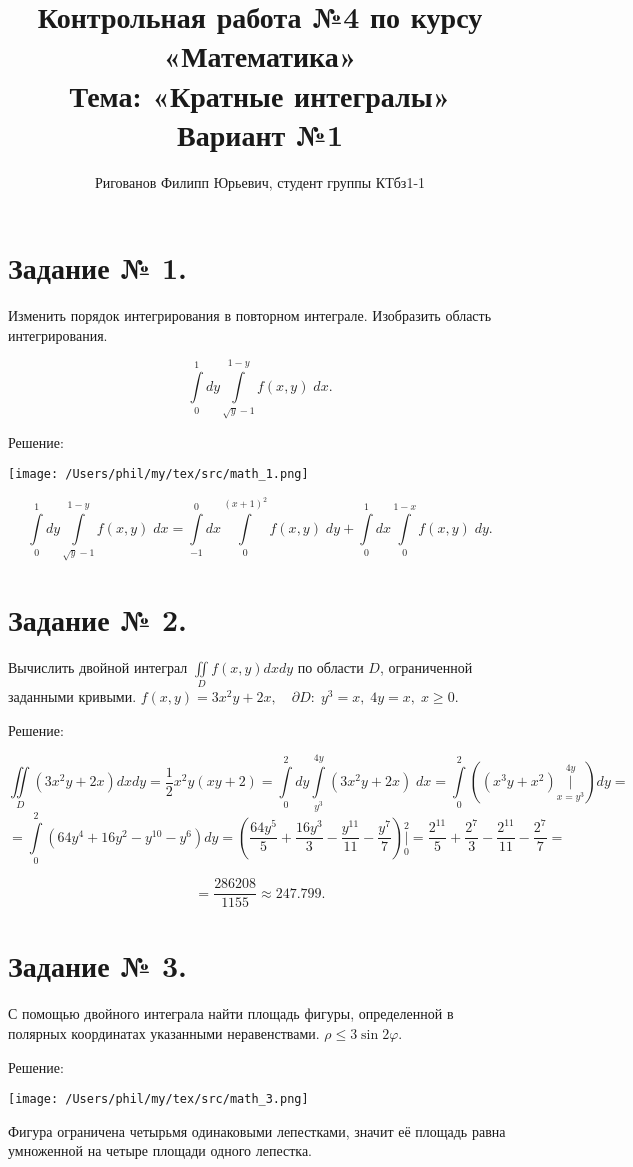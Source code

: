 \documentclass{article}
\title{Контрольная работа №4 по курсу «Математика»\\
Тема: «Кратные интегралы»\\
Вариант №1}
\author{Ригованов Филипп Юрьевич, студент группы КТбз1-1}
\renewcommand{\leq}{\ensuremath{\leqslant}}
\renewcommand{\geq}{\ensuremath{\geqslant}}
\begin{document}
\date{}
\maketitle
\section*{Задание № 1.}
Изменить порядок интегрирования в повторном интеграле. Изобразить область интегрирования.

$$\int\limits_{0}^{1} dy \int\limits_{\sqrt{y}-1}^{1-y} f(x,y)\;dx.$$
\begin{center}Решение:\end{center}
\begin{center}
\texttt{[image: /Users/phil/my/tex/src/math\_1.png]}
\end{center}
$$\int\limits_{0}^{1} dy \int\limits_{\sqrt{y}-1}^{1-y} f(x,y)\;dx=\int\limits_{-1}^{0} dx \int\limits_{0}^{(x+1)^2} f(x,y)\;dy+\int\limits_{0}^{1} dx \int\limits_{0}^{1-x} f(x,y)\;dy.$$

\section*{Задание № 2.}
Вычислить двойной интеграл $\iint\limits_{D} f(x,y)dx dy$ по области $D$, ограниченной заданными кривыми. $f(x,y)=3x^2y+2x,\quad \partial D:\; y^3=x,\; 4y=x,\; x\geq0$.
\begin{center}Решение:\end{center}

$$\iint\limits_{D} \left(3x^2y+2x\right) dx dy=\frac{1}{2}x^2 y (x y+2)=
\int\limits_{0}^{2} dy \int\limits_{y^3}^{4y} \left(3x^2y+2x\right)\;dx=
\int\limits_{0}^{2} \left(\left(x^3y+x^2\right)\bigg|\limits_{x=y^3}^{4y}\right) dy =$$
$$= \int\limits_{0}^{2} \left( 64y^4+16y^2-y^{10}-y^6\right) dy = \left(\frac{64y^5}{5}+\frac{16y^3}{3}-\frac{y^{11}}{11}-\frac{y^7}{7}\right)\bigg|\limits_{0}^{2} = \frac{2^{11}}{5}+\frac{2^7}{3}-\frac{2^{11}}{11}-\frac{2^7}{7}=$$

$$=\frac{286208}{1155}\approx247.799.$$

\section*{Задание № 3.}
С помощью двойного интеграла найти площадь фигуры, определенной в полярных координатах указанными неравенствами. $\rho\leq 3\sin{2\varphi}$.
\begin{center}Решение:\end{center}
\begin{center}
\texttt{[image: /Users/phil/my/tex/src/math\_3.png]}
\end{center}
Фигура ограничена четырьмя одинаковыми лепестками, значит её площадь равна умноженной на четыре площади одного лепестка.
\end{document}
